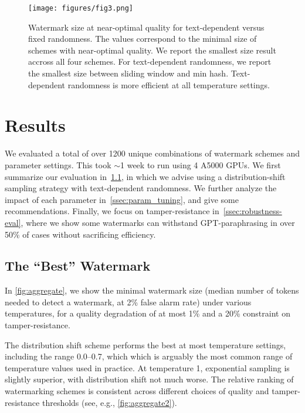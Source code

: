 \begin{figure}
    \centering
    \texttt{[image: figures/fig3.png]}
    \caption{Watermark size at near-optimal quality for text-dependent versus fixed randomness. 
    The values correspond to the minimal size of schemes with near-optimal quality. 
    We report the smallest size result accross all four schemes. For text-dependent randomness, 
    we report the smallest size between sliding window and min hash. 
    Text-dependent randomness is more efficient at all temperature settings.}
    \label{fig:text-dependent_fixed_randomness}
\end{figure}

\section{Results}
\label{sec:results}

We evaluated a total of over 1200 unique combinations of watermark schemes and parameter settings. This took $\sim$1 week to run using 4 A5000 GPUs. We first summarize our 
evaluation in~\cref{ssec:eval_aggregate}, in which we advise using a distribution-shift sampling strategy with text-dependent randomness. 
We further analyze the impact of each parameter in~\cref{ssec:param_tuning}, and give some recommendations. Finally, we focus on 
tamper-resistance in~\cref{ssec:robustness-eval}, where we show some watermarks can withstand GPT-paraphrasing in over 50\% of cases without 
sacrificing efficiency. 

\subsection{The ``Best'' Watermark}\label{ssec:eval_aggregate}
In \cref{fig:aggregate}, we show the minimal watermark size (median number of tokens needed to detect a watermark, 
at 2\% false alarm rate) under various temperatures, for a quality degradation of at most 1\% and a 20\% 
constraint on tamper-resistance.

The distribution shift scheme performs the best at most temperature
settings, including the range 0.0--0.7, which which is arguably the
most common range of temperature values used in practice.
At temperature 1, exponential sampling is slightly superior, with
distribution shift not much worse.
The relative ranking of watermarking schemes is consistent across 
different choices of quality and tamper-resistance thresholds
(see, e.g., \cref{fig:aggregate2}).

